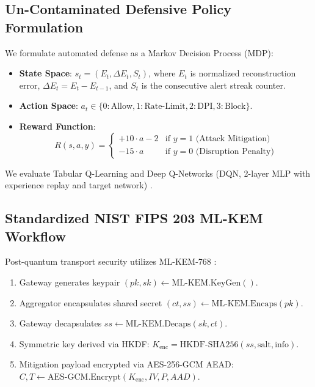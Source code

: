 \documentclass{ieeeaccess}
\begin{document}
\subsection{Un-Contaminated Defensive Policy Formulation}
We formulate automated defense as a Markov Decision Process (MDP):
\begin{itemize}
    \item \textbf{State Space}: $s_t = (E_t, \Delta E_t, S_t)$, where $E_t$ is normalized reconstruction error, $\Delta E_t = E_t - E_{t-1}$, and $S_t$ is the consecutive alert streak counter.
    \item \textbf{Action Space}: $a_t \in \{0: \text{Allow}, 1: \text{Rate-Limit}, 2: \text{DPI}, 3: \text{Block}\}$.
    \item \textbf{Reward Function}:
    \begin{equation}
    R(s, a, y) = 
    \begin{cases}
    +10 \cdot a - 2 & \text{if } y = 1 \text{ (Attack Mitigation)} \\
    -15 \cdot a & \text{if } y = 0 \text{ (Disruption Penalty)}
    \end{cases}
    \end{equation}
\end{itemize}
We evaluate Tabular Q-Learning and Deep Q-Networks (DQN, 2-layer MLP with experience replay and target network) \cite{mnih2015}.

\subsection{Standardized NIST FIPS 203 ML-KEM Workflow}
Post-quantum transport security utilizes ML-KEM-768 \cite{nist2024fips203}:
\begin{enumerate}
    \item Gateway generates keypair $(pk, sk) \leftarrow \text{ML-KEM.KeyGen}()$.
    \item Aggregator encapsulates shared secret $(ct, ss) \leftarrow \text{ML-KEM.Encaps}(pk)$.
    \item Gateway decapsulates $ss \leftarrow \text{ML-KEM.Decaps}(sk, ct)$.
    \item Symmetric key derived via HKDF: $K_{\text{enc}} = \text{HKDF-SHA256}(ss, \text{salt}, \text{info})$.
    \item Mitigation payload encrypted via AES-256-GCM AEAD: $C, T \leftarrow \text{AES-GCM.Encrypt}(K_{\text{enc}}, IV, P, AAD)$.
\end{enumerate}
\end{document}
